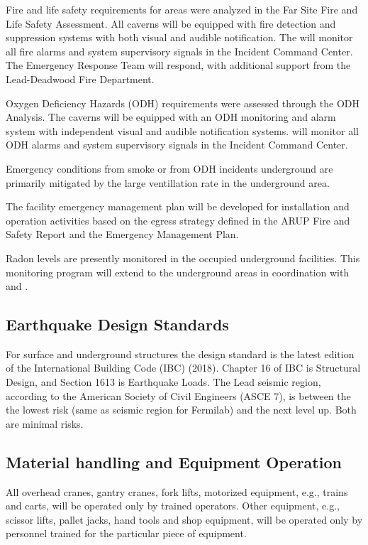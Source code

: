 Fire and life safety requirements for  areas
were analyzed in the  Far Site Fire and Life
Safety Assessment. All caverns will be equipped with fire detection
and suppression systems with both visual and audible notification. The
 will monitor all fire alarms and system supervisory signals in
the  Incident Command Center.  The  Emergency Response Team
will respond, with additional support from the Lead-Deadwood Fire
Department.

Oxygen Deficiency Hazards (ODH) requirements were assessed through the
 ODH Analysis. The caverns will be equipped
with an ODH monitoring and alarm system with independent visual and
audible notification systems.  will monitor all ODH alarms and
system supervisory signals in the  Incident Command Center.

Emergency conditions from smoke or from ODH incidents underground are
primarily mitigated by the large ventillation rate in the 
underground area.

The facility emergency management plan will be developed for
installation and operation activities based on the egress strategy
defined in the ARUP Fire and Safety Report and the  Emergency
Management Plan.

Radon levels are presently monitored in the occupied underground
facilities. This monitoring program will extend to the 
underground areas in coordination with  and 
.

\subsection{Earthquake Design Standards}

For surface and underground structures the design standard is the
latest edition of the International Building Code (IBC) (2018).
Chapter 16 of IBC is Structural Design, and Section 1613 is Earthquake
Loads. The Lead seismic region, according to the American Society of Civil Engineers (ASCE 7), 
is between the the lowest risk (same as seismic
region for Fermilab) and the next level up. Both are minimal risks.

\subsection{Material handling and Equipment Operation}

All overhead cranes, gantry cranes, fork lifts, motorized equipment,
e.g., trains and carts, will be operated only by trained
operators. Other equipment, e.g., scissor lifts, pallet jacks, hand
tools and shop equipment, will be operated only by personnel trained
for the particular piece of equipment. 

